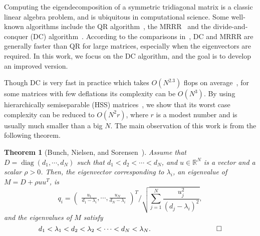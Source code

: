 \documentclass[times]{nlaauth}
\newcommand{\diag}{\mathop{\mathrm{diag}}\nolimits}
\newtheorem{theorem}{Theorem}
\newcounter{algorithm}
\begin{document}
Computing the eigendecomposition of a symmetric tridiagonal matrix is a classic linear algebra
problem, and is ubiquitous in computational science.
Some well-known algorithms include the QR algorithm~\cite{Golub-book2,Parlett-book},
the MRRR~\cite{MRRR-LAA} and the divide-and-conquer (DC) algorithm~\cite{Cuppen81,Gu-eigenvalue}.
According to the comparisons in~\cite{Demmel-eig-perf}, DC and MRRR are generally faster than QR for large matrices, especially when
the eigenvectors are required.
In this work, we focus on the DC algorithm, and the goal is to develop an improved version.

Though DC is very fast in practice which takes $O(N^{2.3})$ flops on average~\cite{Demmel-book,parallel_dc},
for some matrices with few deflations its complexity \cite{Cuppen81,Rutter94,Gu-eigenvalue} can be $O(N^3)$.
By using hierarchically semiseparable (HSS) matrices~\cite{Hss-ulv,Xia-Fast09},
we show that its worst case complexity can be reduced to $O(N^2r)$, where $r$ is a modest
number and is usually much smaller than a big $N$.
The main observation of this work is from the following theorem.

\begin{theorem}[Bunch, Nielsen, and Sorensen~\cite{BNS-Rankone}]
  \label{thm:BNS-R1}
 Assume that $D=\diag(d_1,\cdots,d_N)$ such that $d_1<d_2<\cdots<d_N$, and $u\in \mathbb{R}^N$ is a vector and a scalar $\rho > 0$. Then, the eigenvector corresponding to $\lambda_i$, an eigenvalue of $M=D+\rho uu^T$, is
  \begin{equation}
    \label{eq:EVec}
    q_i =
    \begin{pmatrix}
      \frac{u_1}{d_1-\lambda_i},\cdots,\frac{u_N}{d_N-\lambda_i}
    \end{pmatrix}^T /
    \sqrt{\sum_{j=1}^N \frac{u_j^2}{(d_j-\lambda_i)^2}},
  \end{equation}
  and the eigenvalues of $M$ satisfy
  \begin{equation}
    \label{eq:ev-interlacing}
    d_1 < \lambda_1 < d_2 < \lambda_2 < \cdots < d_N < \lambda_N.  \hspace{1.3in} \square
  \end{equation}
\end{theorem}
\end{document}
